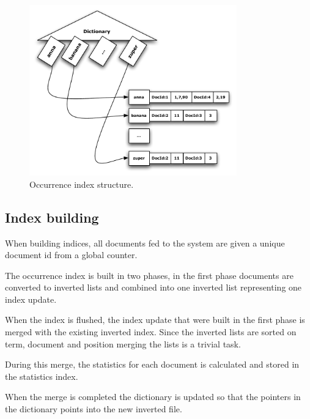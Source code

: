 \documentclass[]{article}
\begin{document}
\begin{figure}[h!!tb]
	\centering
	\includegraphics[width=0.8\textwidth]{index.pdf}
	\caption[Occurrence index structure]{Occurrence index structure.}\label{fig:occ_index_struct}
\end{figure}

\subsection{Index building}\label{sub:index_building}
When building indices, all documents fed to the system are given a unique document id from a global counter.

The occurrence index is built in two phases, in the first phase documents are converted to inverted lists and combined into one inverted list representing one index update. 

When the index is flushed, the index update that were built in the first phase is merged with the existing inverted index. Since the inverted lists are sorted on term, document and position merging the lists is a trivial task. 

During this merge, the statistics for each document is calculated and stored in the statistics index. 

When the merge is completed the dictionary is updated so that the pointers in the dictionary points into the new inverted file. 
\end{document}
